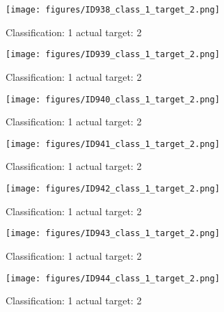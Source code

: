 \begin{figure}[h!]
\begin{center}
\texttt{[image: figures/ID938\_class\_1\_target\_2.png]}
\end{center}
\caption{ Classification: 1 actual target: 2}
\label{fig:ID938_class_1_target_2}
\end{figure}
\begin{figure}[h!]
\begin{center}
\texttt{[image: figures/ID939\_class\_1\_target\_2.png]}
\end{center}
\caption{ Classification: 1 actual target: 2}
\label{fig:ID939_class_1_target_2}
\end{figure}
\begin{figure}[h!]
\begin{center}
\texttt{[image: figures/ID940\_class\_1\_target\_2.png]}
\end{center}
\caption{ Classification: 1 actual target: 2}
\label{fig:ID940_class_1_target_2}
\end{figure}
\begin{figure}[h!]
\begin{center}
\texttt{[image: figures/ID941\_class\_1\_target\_2.png]}
\end{center}
\caption{ Classification: 1 actual target: 2}
\label{fig:ID941_class_1_target_2}
\end{figure}
\begin{figure}[h!]
\begin{center}
\texttt{[image: figures/ID942\_class\_1\_target\_2.png]}
\end{center}
\caption{ Classification: 1 actual target: 2}
\label{fig:ID942_class_1_target_2}
\end{figure}
\begin{figure}[h!]
\begin{center}
\texttt{[image: figures/ID943\_class\_1\_target\_2.png]}
\end{center}
\caption{ Classification: 1 actual target: 2}
\label{fig:ID943_class_1_target_2}
\end{figure}
\begin{figure}[h!]
\begin{center}
\texttt{[image: figures/ID944\_class\_1\_target\_2.png]}
\end{center}
\caption{ Classification: 1 actual target: 2}
\label{fig:ID944_class_1_target_2}
\end{figure}
